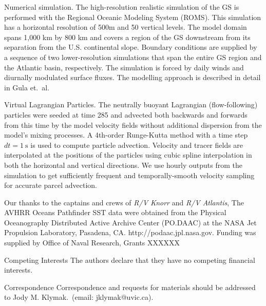\documentclass{natureJMK}
\begin{document}
Numerical simulation. The high-resolution realistic simulation of the GS is performed with the Regional Oceanic Modeling System (ROMS\cite{shchepetkinmcwilliams05}). This simulation has a horizontal resolution of 500m and 50 vertical levels. The model domain spans 1,000 km by 800 km and covers a region of the GS downstream from its separation from the U.S. continental slope. Boundary conditions are supplied by a sequence of two lower-resolution simulations that span the entire GS region and the Atlantic basin, respectively. The simulation is forced by daily winds and diurnally modulated surface fluxes. The modelling approach is described in detail in Gula et.\ al\cite{gulaetal15}.

Virtual Lagrangian Particles.  The neutrally buoyant Lagrangian (flow-following) particles were seeded at time 285 and advected both backwards and forwards from this time by the model velocity fields without  additional dispersion from the model's mixing processes\cite{gulaetal14}. A 4th-order Runge-Kutta method with a  time step  $dt = 1\ \mathrm{s}$ is used to compute particle advection. Velocity and tracer fields are interpolated at the positions of the particles using cubic spline interpolation in both the horizontal and vertical directions.  We use hourly outputs from the simulation to get sufficiently frequent and temporally-smooth velocity sampling for accurate parcel advection.










\clearpage
\listoffigures
\clearpage

\begin{addendum}
 \item  Our thanks to the captains and crews of \emph{R/V Knorr} and \emph{R/V Atlantis}, The AVHRR Oceans Pathfinder SST data were obtained from the Physical Oceanography Distributed Active Archive Center (PO.DAAC) at the NASA Jet Propulsion Laboratory, Pasadena, CA. http://podaac.jpl.nasa.gov. Funding was supplied by Office of Naval Research, Grants XXXXXX
 \item[Competing Interests] The authors declare that they have no
competing financial interests.
 \item[Correspondence] Correspondence and requests for materials
should be addressed to Jody M. Klymak.~(email: jklymak@uvic.ca).
\end{addendum}
\clearpage
\end{document}
